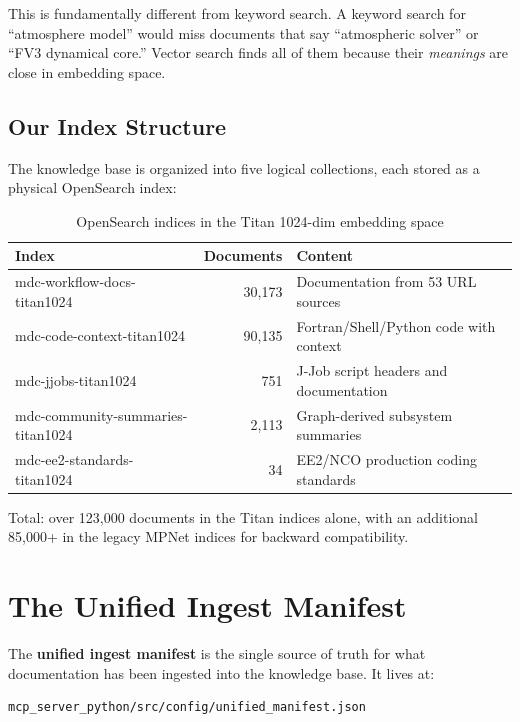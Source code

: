 \documentclass[11pt,letterpaper]{article}
\begin{document}
This is fundamentally different from keyword search. A keyword search
for ``atmosphere model'' would miss documents that say ``atmospheric
solver'' or ``FV3 dynamical core.'' Vector search finds all of them
because their \emph{meanings} are close in embedding space.

\subsection{Our Index Structure}

The knowledge base is organized into five logical collections, each
stored as a physical OpenSearch index:

\begin{table}[h]
\centering
\begin{tabular}{lrl}
\toprule
\textbf{Index} & \textbf{Documents} & \textbf{Content} \\
\midrule
mdc-workflow-docs-titan1024 & 30,173 & Documentation from 53 URL sources \\
mdc-code-context-titan1024 & 90,135 & Fortran/Shell/Python code with context \\
mdc-jjobs-titan1024 & 751 & J-Job script headers and documentation \\
mdc-community-summaries-titan1024 & 2,113 & Graph-derived subsystem summaries \\
mdc-ee2-standards-titan1024 & 34 & EE2/NCO production coding standards \\
\bottomrule
\end{tabular}
\caption{OpenSearch indices in the Titan 1024-dim embedding space}
\end{table}

Total: over 123,000 documents in the Titan indices alone, with an
additional 85,000+ in the legacy MPNet indices for backward
compatibility.

\section{The Unified Ingest Manifest}

The \textbf{unified ingest manifest} is the single source of truth for
what documentation has been ingested into the knowledge base. It lives
at:

\begin{verbatim}
mcp_server_python/src/config/unified_manifest.json
\end{verbatim}
\end{document}
